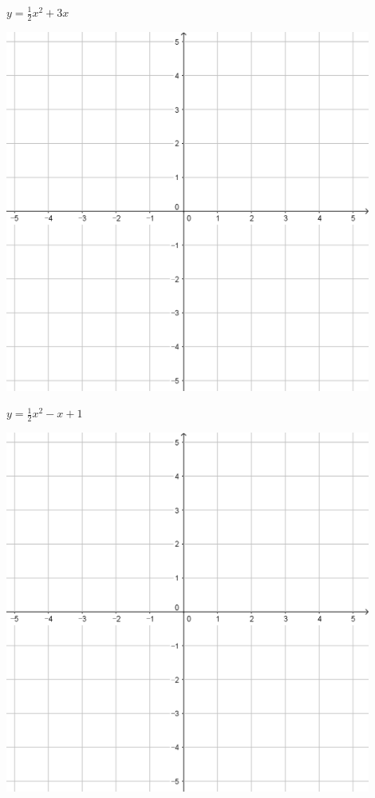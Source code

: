 \documentclass{oblivoir}
\begin{document}
\begin{minipage}{0.45\textwidth}\centering
\(y=\frac12x^2+3x\)
\par\bigskip\includegraphics[width=0.9\textwidth]{55}
\end{minipage}
\begin{minipage}{0.45\textwidth}\centering
\(y=\frac12x^2-x+1\)
\par\bigskip\includegraphics[width=0.9\textwidth]{55}
\end{minipage}\bigskip\bigskip\par
\end{document}
